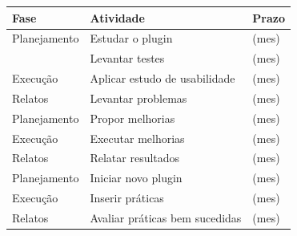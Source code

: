\begin{table}[h]
\begin{tabular}{|l|l|l|}
\hline
\textbf{Fase}            & \textbf{Atividade}             & \textbf{Prazo} \\ \hline
Planejamento             & Estudar o plugin               & (mes)          \\ \hline
                         & Levantar testes                & (mes)          \\ \hline
Execução                 & Aplicar estudo de usabilidade  & (mes)          \\ \hline
Relatos                  & Levantar problemas             & (mes)          \\ \hline
Planejamento             & Propor melhorias               & (mes)          \\ \hline
Execução                 & Executar melhorias             & (mes)          \\ \hline
Relatos                  & Relatar resultados             & (mes)          \\ \hline
Planejamento             & Iniciar novo plugin            & (mes)          \\ \hline
Execução                 & Inserir práticas               & (mes)          \\ \hline
Relatos                  & Avaliar práticas bem sucedidas & (mes)          \\ \hline

\end{tabular}
\end{table}

